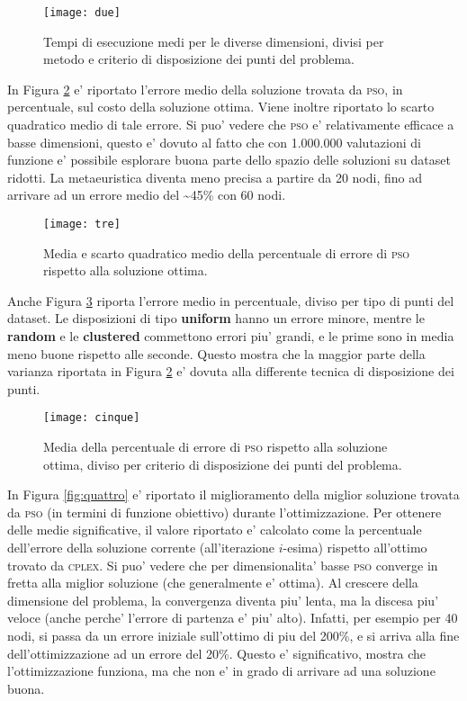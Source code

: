 \documentclass[
12pt, %
a4paper, %
oneside, %
headinclude,footinclude, %
BCOR5mm, %
]{scrartcl}
\begin{document}
\begin{figure}[htpb]
	\centering
	\texttt{[image: due]}
	\caption[]{Tempi di esecuzione medi per le diverse dimensioni, divisi per metodo e criterio di disposizione dei punti del problema. }
	\label{fig:due}
\end{figure}

In Figura \ref{fig:tre} e' riportato l'errore medio della soluzione trovata da \textsc{pso}, in percentuale, sul costo della soluzione ottima. Viene inoltre riportato lo scarto quadratico medio di tale errore. Si puo' vedere che \textsc{pso} e' relativamente efficace a basse dimensioni, questo e' dovuto al fatto che con 1.000.000 valutazioni di funzione e' possibile esplorare buona parte dello spazio delle soluzioni su dataset ridotti. La metaeuristica diventa meno precisa a partire da 20 nodi, fino ad arrivare ad un errore medio del \textasciitilde 45\% con 60 nodi.

\begin{figure}[htpb]
	\centering
	\texttt{[image: tre]}
	\caption[]{Media e scarto quadratico medio della percentuale di errore di \textsc{pso} rispetto alla soluzione ottima.}
	\label{fig:tre}
\end{figure}

Anche Figura \ref{fig:cinque} riporta l'errore medio in percentuale, diviso per tipo di punti del dataset. Le disposizioni di tipo \textbf{uniform} hanno un errore minore, mentre le \textbf{random} e le \textbf{clustered} commettono errori piu' grandi, e le prime sono in media meno buone rispetto alle seconde. Questo mostra che la maggior parte della varianza riportata in Figura \ref{fig:tre} e' dovuta alla differente tecnica di disposizione dei punti.

\begin{figure}[htpb]
	\centering
	\texttt{[image: cinque]}
	\caption[]{Media della percentuale di errore di \textsc{pso} rispetto alla soluzione ottima, diviso per criterio di disposizione dei punti del problema.}
	\label{fig:cinque}
\end{figure}


In Figura \ref{fig:quattro} e' riportato il miglioramento della miglior soluzione trovata da \textsc{pso} (in termini di funzione obiettivo) durante l'ottimizzazione. Per ottenere delle medie significative, il valore riportato e' calcolato come la percentuale dell'errore della soluzione corrente (all'iterazione $i$-esima) rispetto all'ottimo trovato da \textsc{cplex}. Si puo' vedere che per dimensionalita' basse \textsc{pso} converge in fretta alla miglior soluzione (che generalmente e' ottima). Al crescere della dimensione del problema, la convergenza diventa piu' lenta, ma la discesa piu' veloce (anche perche' l'errore di partenza e' piu' alto). Infatti, per esempio per 40 nodi, si passa da un errore iniziale sull'ottimo di piu del 200\%, e si arriva alla fine dell'ottimizzazione ad un errore del 20\%. Questo e' significativo, mostra che l'ottimizzazione funziona, ma che non e' in grado di arrivare ad una soluzione buona.
\end{document}
